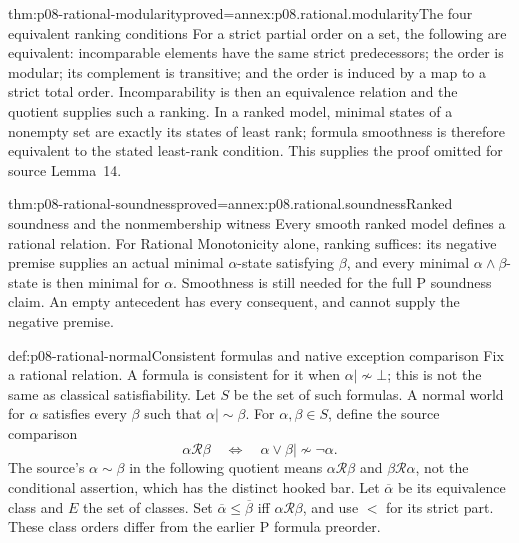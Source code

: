 \begin{hbtheorem}{thm:p08-rational-modularity}{proved=annex:p08.rational.modularity}{The four equivalent ranking conditions}
For a strict partial order on a set, the following are equivalent:
incomparable elements have the same strict predecessors; the order is
modular; its complement is transitive; and the order is induced by a
map to a strict total order. Incomparability is then an equivalence
relation and the quotient supplies such a ranking. In a ranked model,
minimal states of a nonempty set are exactly its states of least rank;
formula smoothness is therefore equivalent to the stated least-rank
condition. This supplies the proof omitted for source Lemma~14.
\end{hbtheorem}

\begin{hbtheorem}{thm:p08-rational-soundness}{proved=annex:p08.rational.soundness}{Ranked soundness and the nonmembership witness}
Every smooth ranked model defines a rational relation. For Rational
Monotonicity alone, ranking suffices: its negative premise supplies an
actual minimal \(\alpha\)-state satisfying \(\beta\), and every
minimal \(\alpha\wedge\beta\)-state is then minimal for
\(\alpha\). Smoothness is still needed for the full P soundness
claim. An empty antecedent has every consequent, and cannot supply the
negative premise.
\end{hbtheorem}

\begin{hbdefinition}{def:p08-rational-normal}{Consistent formulas and native exception comparison}
Fix a rational relation. A formula is consistent for it when
\(\alpha\mathrel{|\!\not\sim}\bot\); this is not the same
as classical satisfiability. Let \(S\) be the set of such formulas.
A normal world for \(\alpha\) satisfies every \(\beta\) such
that \(\alpha\mathrel{|\!\sim}\beta\). For \(\alpha,\beta\in S\),
define the source comparison
\[
 \alpha\mathcal R\beta
 \quad\Longleftrightarrow\quad
 \alpha\vee\beta\mathrel{|\!\not\sim}\neg\alpha.
\]
The source's \(\alpha\sim\beta\) in the following quotient means
\(\alpha\mathcal R\beta\) and \(\beta\mathcal R\alpha\),
not the conditional assertion, which has the distinct hooked bar.
Let \(\overline\alpha\) be its equivalence class and \(E\) the
set of classes. Set \(\overline\alpha\leq\overline\beta\)
iff \(\alpha\mathcal R\beta\), and use \(<\) for its strict
part. These class orders differ from the earlier P formula preorder.
\end{hbdefinition}

